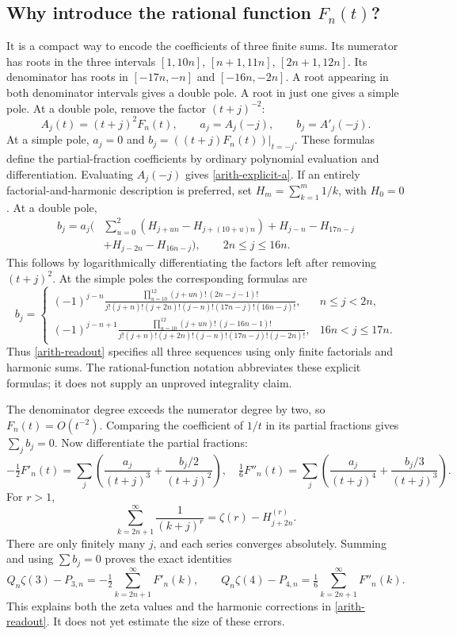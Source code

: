 \documentclass[11pt]{article}
\begin{document}
\subsection{Why introduce the rational function $F_n(t)$?}
It is a compact way to encode the coefficients of three finite sums.
Its numerator has roots in the three intervals
$[1,10n]$, $[n+1,11n]$, $[2n+1,12n]$. Its denominator has roots in
$[-17n,-n]$ and $[-16n,-2n]$. A root appearing in both denominator
intervals gives a double pole. A root in just one gives a simple pole.
At a double pole, remove the factor $(t+j)^{-2}$:
\[
 A_j(t)=(t+j)^2F_n(t),\qquad a_j=A_j(-j),\qquad b_j=A'_j(-j).
\]
At a simple pole, $a_j=0$ and $b_j=((t+j)F_n(t))|_{t=-j}$.
These formulas define the partial-fraction coefficients by ordinary
polynomial evaluation and differentiation. Evaluating $A_j(-j)$ gives
\eqref{arith-explicit-a}.
If an entirely factorial-and-harmonic description is preferred, set
$H_m=\sum_{k=1}^m1/k$, with $H_0=0$. At a double pole,
\begin{align*}
 b_j=a_j\bigg(&\sum_{u=0}^2(H_{j+un}-H_{j+(10+u)n})
 +H_{j-n}-H_{17n-j}\\
 &+H_{j-2n}-H_{16n-j}\bigg),\qquad 2n\leq j\leq16n.
\end{align*}
This follows by logarithmically differentiating the factors left after
removing $(t+j)^2$. At the simple poles the corresponding formulas are
\[
 b_j=\begin{cases}
 \displaystyle(-1)^{j-n}
 \frac{\prod_{u=10}^{12}(j+un)!\,(2n-j-1)!}
 {j!(j+n)!(j+2n)!(j-n)!(17n-j)!(16n-j)!},&n\leq j<2n,\\[6pt]
 \displaystyle(-1)^{j-n+1}
 \frac{\prod_{u=10}^{12}(j+un)!\,(j-16n-1)!}
 {j!(j+n)!(j+2n)!(j-n)!(17n-j)!(j-2n)!},&16n<j\leq17n.
 \end{cases}
\]
Thus \eqref{arith-readout} specifies all three sequences using only finite
factorials and harmonic sums. The rational-function notation abbreviates
these explicit formulas; it does not supply an unproved integrality claim.

The denominator degree exceeds the numerator degree by two, so
$F_n(t)=O(t^{-2})$. Comparing the coefficient of $1/t$ in its partial
fractions gives $\sum_jb_j=0$. Now differentiate the partial fractions:
\[
 -\tfrac12 F'_n(t)=\sum_j\left(\frac{a_j}{(t+j)^3}
                         +\frac{b_j/2}{(t+j)^2}\right),\quad
 \tfrac16 F''_n(t)=\sum_j\left(\frac{a_j}{(t+j)^4}
                         +\frac{b_j/3}{(t+j)^3}\right).
\]
For $r>1$,
\[
 \sum_{k=2n+1}^{\infty}\frac1{(k+j)^r}
 =\zeta(r)-H^{(r)}_{j+2n}.
\]
There are only finitely many $j$, and each series converges absolutely.
Summing and using $\sum b_j=0$ proves the exact identities
\begin{equation}\label{arith-derivative-tails}
 \boxed{\displaystyle
 Q_n\zeta(3)-P_{3,n}=-\tfrac12\sum_{k=2n+1}^{\infty}F'_n(k),\qquad
 Q_n\zeta(4)-P_{4,n}=\tfrac16\sum_{k=2n+1}^{\infty}F''_n(k).}
\end{equation}
This explains both the zeta values and the harmonic corrections in
\eqref{arith-readout}. It does not yet estimate the size of these errors.
\end{document}
